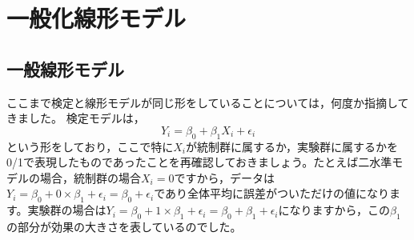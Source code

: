 \documentclass{ltjsbook}
\begin{document}
 
\chapter{一般化線形モデル}
\VerbatimFootnotes
\label{chapter24} 
\section{一般線形モデル}
ここまで検定と線形モデルが同じ形をしていることについては，何度か指摘してきました。
検定モデルは，
\[ Y_{i} = \beta_0 + \beta_1 X_{i} + \epsilon_{i}\]
という形をしており，ここで特に$X_{i}$が統制群に属するか，実験群に属するかを0/1で表現したものであったことを再確認しておきましょう。たとえば二水準モデルの場合，統制群の場合$X_i=0$ですから，データは$Y_i = \beta_0 + 0\times \beta_1+ \epsilon_{i} = \beta_0+ \epsilon_{i}$であり全体平均に誤差がついただけの値になります。実験群の場合は$Y_i = \beta_0 + 1 \times \beta_1 + \epsilon_{i}= \beta_0 + \beta_1+ \epsilon_{i}$になりますから，この$\beta_1$の部分が効果の大きさを表しているのでした。
\end{document}
